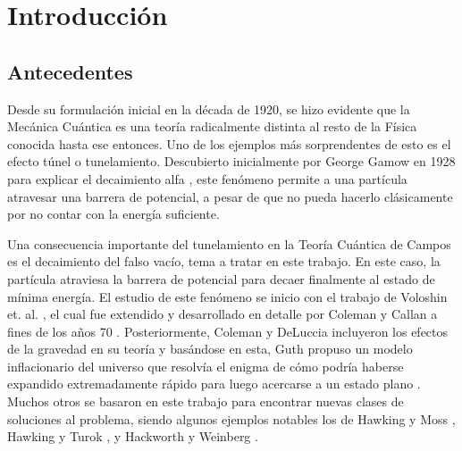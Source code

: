 
\chapter{Introducción} %

\section{Antecedentes}

Desde su formulación inicial en la década de 1920, se hizo evidente que la Mecánica Cuántica es una teoría radicalmente distinta al resto de la Física conocida hasta ese entonces. Uno de los ejemplos más sorprendentes de esto es el efecto túnel o tunelamiento. Descubierto inicialmente por George Gamow en 1928 para explicar el decaimiento alfa \cite{gamow1928quantum}, este fenómeno permite a una partícula atravesar una barrera de potencial, a pesar de que no pueda hacerlo clásicamente por no contar con la energía suficiente. %

Una consecuencia importante del tunelamiento en la Teoría Cuántica de Campos es el decaimiento del falso vacío, tema a tratar en este trabajo. En este caso, la partícula atraviesa la barrera de potencial para decaer finalmente al estado de mínima energía. El estudio de este fenómeno se inicio con el trabajo de Voloshin et. al. \cite{Kobzarev:1974cp}, el cual fue extendido y desarrollado en detalle por Coleman y Callan a fines de los años 70 \cite{coleman1977fate, callan1977fate}. Posteriormente, Coleman y DeLuccia incluyeron los efectos de la gravedad en su teoría \cite{coleman1980gravitational} y basándose en esta, Guth propuso un modelo inflacionario del universo que resolvía el enigma de cómo podría haberse expandido extremadamente rápido para luego acercarse a un estado plano \cite{guth1981inflationary}. Muchos otros se basaron en este trabajo para encontrar nuevas clases de soluciones al problema, siendo algunos ejemplos notables los de Hawking y Moss \cite{hawking1982supercooled}, Hawking y Turok \cite{hawking1998open}, y Hackworth y Weinberg \cite{hackworth2005oscillating}.

